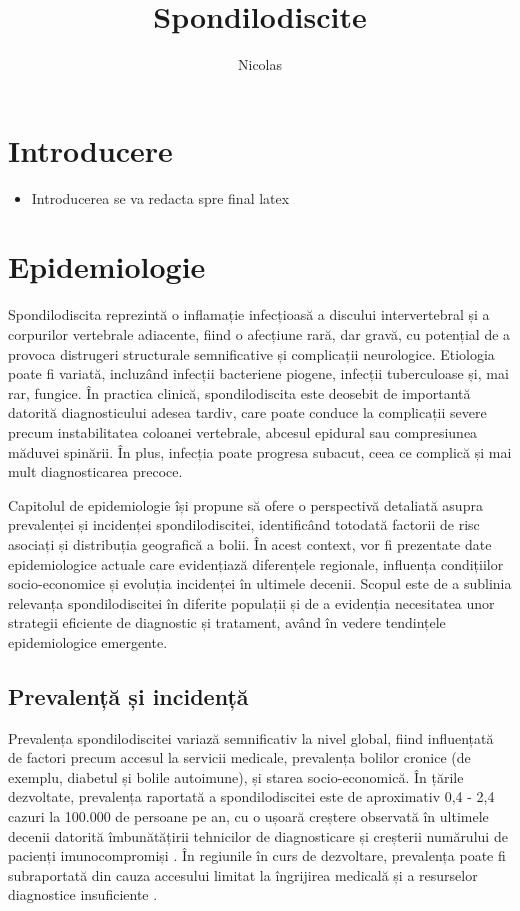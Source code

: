 \documentclass[romanian,12pt,a4paper]{article}
\title{Spondilodiscite}
\author{Nicolas}
\date{}
\begin{document}
	
	\maketitle

\pagebreak
\section{Introducere}

\begin{itemize}
\item
  Introducerea se va redacta spre final latex
\end{itemize}
\pagebreak
\section{Epidemiologie}

Spondilodiscita reprezintă o inflamație infecțioasă a discului
intervertebral și a corpurilor vertebrale adiacente, fiind o afecțiune
rară, dar gravă, cu potențial de a provoca distrugeri structurale
semnificative și complicații neurologice. Etiologia poate fi variată,
incluzând infecții bacteriene piogene, infecții tuberculoase și, mai
rar, fungice. În practica clinică, spondilodiscita este
deosebit de importantă datorită diagnosticului adesea tardiv, care poate
conduce la complicații severe precum instabilitatea coloanei vertebrale,
abcesul epidural sau compresiunea măduvei spinării. În plus, infecția
poate progresa subacut, ceea ce complică și mai mult diagnosticarea
precoce.

Capitolul de epidemiologie își propune să ofere o perspectivă detaliată
asupra prevalenței și incidenței spondilodiscitei, identificând totodată
factorii de risc asociați și distribuția geografică a bolii. În acest
context, vor fi prezentate date epidemiologice actuale care evidențiază
diferențele regionale, influența condițiilor socio-economice și evoluția
incidenței în ultimele decenii. Scopul este de a sublinia relevanța
spondilodiscitei în diferite populații și de a evidenția necesitatea
unor strategii eficiente de diagnostic și tratament, având în vedere
tendințele epidemiologice emergente.

\subsection{Prevalență și incidență}

Prevalența spondilodiscitei variază semnificativ la nivel global, fiind
influențată de factori precum accesul la servicii medicale, prevalența
bolilor cronice (de exemplu, diabetul și bolile autoimune), și starea
socio-economică. În țările dezvoltate, prevalența raportată a
spondilodiscitei este de aproximativ 0,4 - 2,4 cazuri la 100.000 de
persoane pe an, cu o ușoară creștere observată în ultimele decenii
datorită îmbunătățirii tehnicilor de diagnosticare și creșterii
numărului de pacienți imunocompromiși \cite{RoleNuclearMedicine2012}. În
regiunile în curs de dezvoltare, prevalența poate fi subraportată din
cauza accesului limitat la îngrijirea medicală și a resurselor
diagnostice insuficiente \cite{RadionuclideImagingMusculoskeletal2016}.
\end{document}
